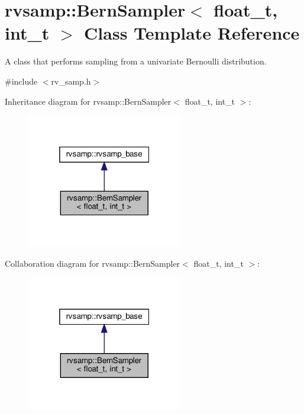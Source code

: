 \hypertarget{classrvsamp_1_1BernSampler}{}\section{rvsamp\+:\+:Bern\+Sampler$<$ float\+\_\+t, int\+\_\+t $>$ Class Template Reference}
\label{classrvsamp_1_1BernSampler}


A class that performs sampling from a univariate Bernoulli distribution.  




{\ttfamily \#include $<$rv\+\_\+samp.\+h$>$}



Inheritance diagram for rvsamp\+:\+:Bern\+Sampler$<$ float\+\_\+t, int\+\_\+t $>$\+:\nopagebreak
\begin{figure}[H]
\begin{center}
\leavevmode
\includegraphics[width=193pt]{classrvsamp_1_1BernSampler__inherit__graph}
\end{center}
\end{figure}


Collaboration diagram for rvsamp\+:\+:Bern\+Sampler$<$ float\+\_\+t, int\+\_\+t $>$\+:\nopagebreak
\begin{figure}[H]
\begin{center}
\leavevmode
\includegraphics[width=193pt]{classrvsamp_1_1BernSampler__coll__graph}
\end{center}
\end{figure}
